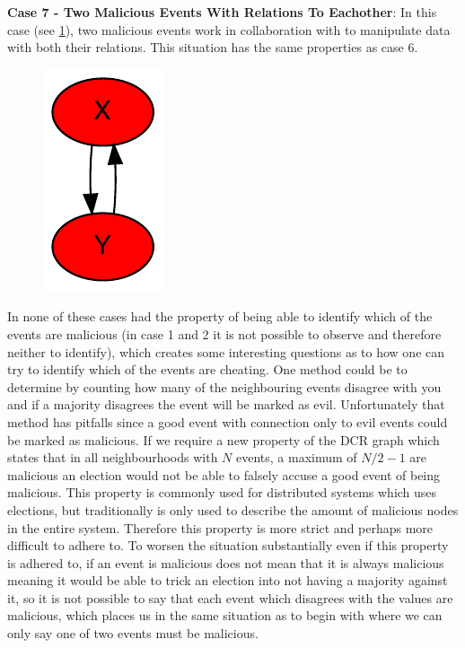 	\newpar \textbf{Case 7 - Two Malicious Events With Relations To Eachother}: In this case (see \ref{fig:consensus:two-malicious-with-twoway-malicious-relation}), two malicious events work in collaboration with to manipulate data with both their relations. This situation has the same properties as case 6.
	
	\begin{figure}[H]
		\centering
		\includegraphics[]{5validation/images/7.pdf}
		\caption{}
		\label{fig:consensus:two-malicious-with-twoway-malicious-relation}
	\end{figure}
	
	
	\newpar In none of these cases had the property of being able to identify which of the events are malicious (in case 1 and 2 it is not possible to observe and therefore neither to identify), which creates some interesting questions as to how one can try to identify which of the events are cheating. One method could be to determine by counting how many of the neighbouring events disagree with you and if a majority disagrees the event will be marked as evil. Unfortunately that method has pitfalls since a good event with connection only to evil events could be marked as malicious. If we require a new property of the DCR graph which states that in all neighbourhoods with $N$ events, a maximum of $N/2-1$ are malicious an election would not be able to falsely accuse a good event of being malicious. This property is commonly used for distributed systems which uses elections, but traditionally is only used to describe the amount of malicious nodes in the entire system. Therefore this property is more strict and perhaps more difficult to adhere to. To worsen the situation substantially even if this property is adhered to, if an event is malicious does not mean that it is always malicious meaning it would be able to trick an election into not having a majority against it, so it is not possible to say that each event which disagrees with the values are malicious, which places us in the same situation as to begin with where we can only say one of two events must be malicious.
	
